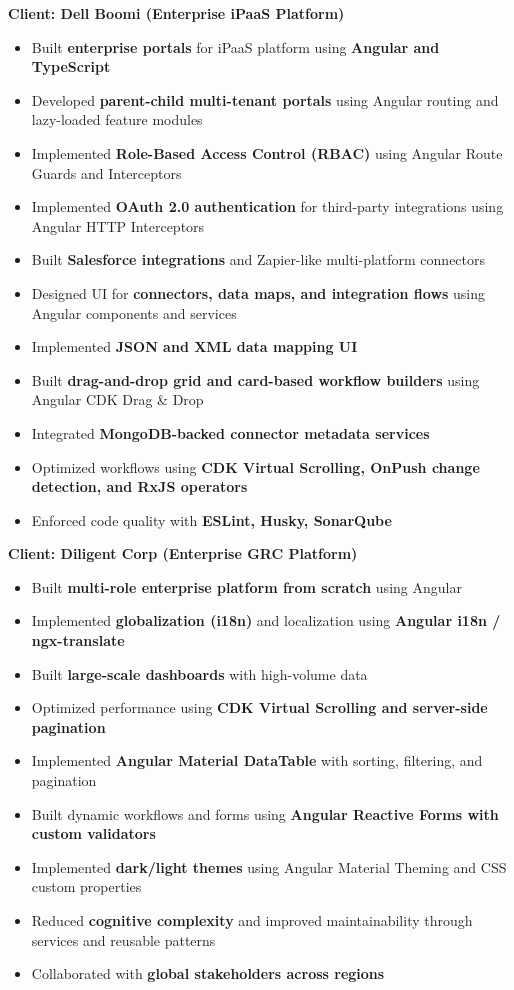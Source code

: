 \documentclass[11pt,a4paper]{article}
\begin{document}
\vspace{4pt}
\textbf{Client: Dell Boomi (Enterprise iPaaS Platform)}
\begin{itemize}[leftmargin=*]
\item Built \textbf{enterprise portals} for iPaaS platform using \textbf{Angular and TypeScript}
\item Developed \textbf{parent-child multi-tenant portals} using Angular routing and lazy-loaded feature modules
\item Implemented \textbf{Role-Based Access Control (RBAC)} using Angular Route Guards and Interceptors
\item Implemented \textbf{OAuth 2.0 authentication} for third-party integrations using Angular HTTP Interceptors
\item Built \textbf{Salesforce integrations} and Zapier-like multi-platform connectors
\item Designed UI for \textbf{connectors, data maps, and integration flows} using Angular components and services
\item Implemented \textbf{JSON and XML data mapping UI}
\item Built \textbf{drag-and-drop grid and card-based workflow builders} using Angular CDK Drag \& Drop
\item Integrated \textbf{MongoDB-backed connector metadata services}
\item Optimized workflows using \textbf{CDK Virtual Scrolling, OnPush change detection, and RxJS operators}
\item Enforced code quality with \textbf{ESLint, Husky, SonarQube}
\end{itemize}

\vspace{4pt}
\textbf{Client: Diligent Corp (Enterprise GRC Platform)}
\begin{itemize}[leftmargin=*]
\item Built \textbf{multi-role enterprise platform from scratch} using Angular
\item Implemented \textbf{globalization (i18n)} and localization using \textbf{Angular i18n / ngx-translate}
\item Built \textbf{large-scale dashboards} with high-volume data
\item Optimized performance using \textbf{CDK Virtual Scrolling and server-side pagination}
\item Implemented \textbf{Angular Material DataTable} with sorting, filtering, and pagination
\item Built dynamic workflows and forms using \textbf{Angular Reactive Forms with custom validators}
\item Implemented \textbf{dark/light themes} using Angular Material Theming and CSS custom properties
\item Reduced \textbf{cognitive complexity} and improved maintainability through services and reusable patterns
\item Collaborated with \textbf{global stakeholders across regions}
\end{itemize}
\end{document}
